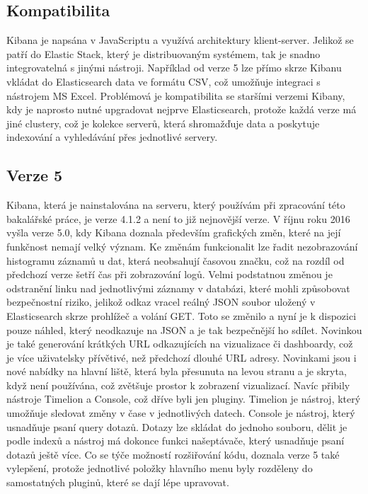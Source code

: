 \documentclass[czech,BP]{thesiskiv}
\begin{document}
 \subsection{Kompatibilita}
	Kibana je napsána v JavaScriptu a využívá architektury klient-server. Jelikož se patří do Elastic Stack, který je distribuovaným systémem, tak je snadno integrovatelná s jinými nástroji. Například od verze 5 lze přímo skrze Kibanu vkládat do Elasticsearch data ve formátu CSV, což umožňuje integraci s nástrojem MS Excel. Problémová je kompatibilita se staršími verzemi Kibany, kdy je naprosto nutné upgradovat nejprve Elasticsearch, protože každá verze má jiné clustery, což je kolekce serverů, která shromažďuje data a poskytuje indexování a vyhledávání přes jednotlivé servery.
 
 \subsection{Verze 5}
 Kibana, která je nainstalována na serveru, který používám při zpracování této bakalářské práce, je  verze 4.1.2  a není to již nejnovější verze. V říjnu roku 2016 vyšla verze 5.0, kdy Kibana doznala především grafických změn, které na její funkčnost nemají velký význam. Ke změnám funkcionalit lze řadit nezobrazování histogramu záznamů u dat, která neobsahují časovou značku, což na rozdíl od předchozí verze šetří čas při zobrazování logů. Velmi podstatnou změnou je odstranění linku nad jednotlivými záznamy v databázi, které mohli způsobovat bezpečnostní riziko, jelikož odkaz vracel reálný JSON soubor uložený v Elasticsearch skrze prohlížeč a volání GET. Toto se změnilo a nyní je k dispozici pouze náhled, který neodkazuje na JSON a je tak bezpečnější ho sdílet. Novinkou je také generování krátkých URL odkazujících na vizualizace či dashboardy, což je více uživatelsky přívětivé, než předchozí dlouhé URL adresy. Novinkami jsou i nové nabídky na hlavní liště, která byla přesunuta na levou stranu a je skryta, když není používána, což zvětšuje prostor k zobrazení vizualizací. Navíc přibily nástroje Timelion a Console, což dříve byli jen pluginy. Timelion je nástroj, který umožňuje sledovat změny v čase v jednotlivých datech. Console je nástroj, který usnadňuje psaní query dotazů. Dotazy lze skládat do jednoho souboru, dělit je podle indexů a nástroj má dokonce funkci našeptávače, který usnadňuje psaní dotazů  ještě více. Co se týče možností rozšiřování kódu, doznala verze 5 také vylepšení, protože jednotlivé položky hlavního menu byly rozděleny do samostatných pluginů, které se dají lépe upravovat.
 
\end{document}
